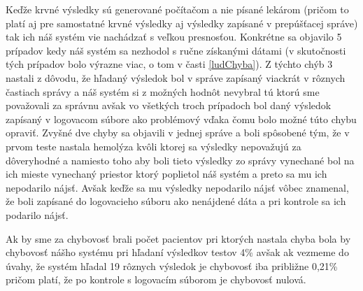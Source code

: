 Keďže krvné výsledky sú generované počítačom a nie písané lekárom (pričom to platí aj pre samostatné krvné výsledky aj výsledky zapísané v prepúšťacej správe) tak ich náš systém vie nachádzať s veľkou presnosťou. Konkrétne sa objavilo 5 prípadov kedy náš systém sa nezhodol s ručne získanými dátami (v skutočnosti tých prípadov bolo výrazne viac, o tom v časti \ref{ludChyba}). Z týchto chýb 3 nastali z dôvodu, že hľadaný výsledok bol v správe zapísaný viackrát v rôznych častiach správy a náš systém si z možných hodnôt nevybral tú ktorú sme považovali za správnu avšak vo všetkých troch prípadoch bol daný výsledok zapísaný v logovacom súbore ako problémový vďaka čomu bolo možné túto chybu opraviť. Zvyšné dve chyby sa objavili v jednej správe a boli spôsobené tým, že v prvom teste nastala hemolýza kvôli ktorej sa výsledky nepovažujú za dôveryhodné a namiesto toho aby boli tieto výsledky zo správy vynechané bol na ich mieste vynechaný priestor ktorý poplietol náš systém a preto sa mu ich nepodarilo nájsť. Avšak keďže sa mu výsledky nepodarilo nájsť vôbec znamenal, že boli zapísané do logovacieho súboru ako nenájdené dáta a pri kontrole sa ich podarilo nájsť.

Ak by sme za chybovosť brali počet pacientov pri ktorých nastala chyba bola by chybovosť nášho systému pri hľadaní výsledkov testov 4\% avšak ak vezmeme do úvahy, že systém hľadal 19 rôznych výsledok je chybovosť iba približne 0,21\% pričom platí, že po kontrole s logovacím súborom je chybovosť nulová.


